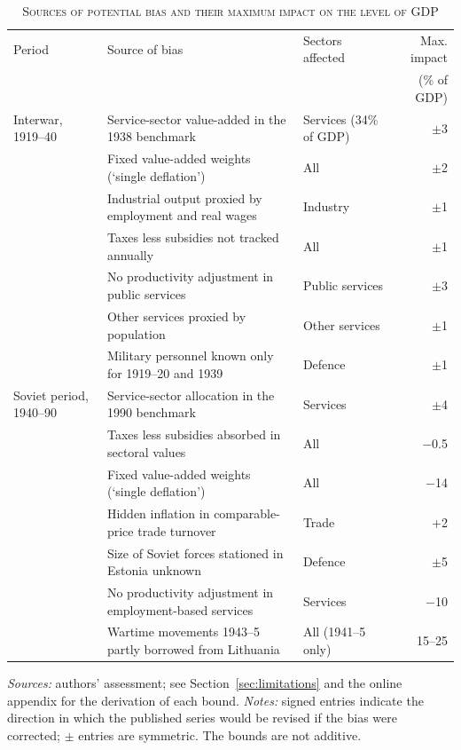 \begin{table}[htbp]
\centering\footnotesize\setlength{\tabcolsep}{4pt}
\caption[Sources of potential bias and their maximum impact on the level of GDP]{\textsc{Sources of potential bias and their maximum impact on the level of GDP}}
\label{tab:sensitivity}
\begin{threeparttable}
\begin{tabular}{p{2.5cm}p{6.6cm}p{2.4cm}r}
\toprule
Period & Source of bias & Sectors affected & Max. impact \\
& & & (\% of GDP) \\
\midrule
Interwar, 1919--40 & Service-sector value-added in the 1938 benchmark & Services (34\% of GDP) & $\pm$3 \\
 & Fixed value-added weights (`single deflation') & All & $\pm$2 \\
 & Industrial output proxied by employment and real wages & Industry & $\pm$1 \\
 & Taxes less subsidies not tracked annually & All & $\pm$1 \\
 & No productivity adjustment in public services & Public services & $\pm$3 \\
 & Other services proxied by population & Other services & $\pm$1 \\
 & Military personnel known only for 1919--20 and 1939 & Defence & $\pm$1 \\
\midrule
Soviet period, 1940--90 & Service-sector allocation in the 1990 benchmark & Services & $\pm$4 \\
 & Taxes less subsidies absorbed in sectoral values & All & $-$0.5 \\
 & Fixed value-added weights (`single deflation') & All & $-$14 \\
 & Hidden inflation in comparable-price trade turnover & Trade & +2 \\
 & Size of Soviet forces stationed in Estonia unknown & Defence & $\pm$5 \\
 & No productivity adjustment in employment-based services & Services & $-$10 \\
 & Wartime movements 1943--5 partly borrowed from Lithuania & All (1941--5 only) & 15--25 \\
\bottomrule
\end{tabular}
\begin{tablenotes}
\footnotesize
\textit{Sources:} authors' assessment; see Section~\ref{sec:limitations} and the online appendix for the derivation of each bound. \textit{Notes:} signed entries indicate the direction in which the published series would be revised if the bias were corrected; $\pm$ entries are symmetric. The bounds are not additive.
\end{tablenotes}
\end{threeparttable}
\end{table}
